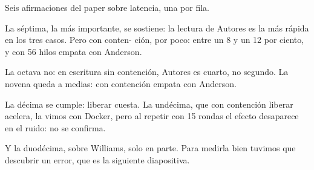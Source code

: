 Seis afirmaciones del paper sobre latencia, una por fila.

La séptima, la más importante, se sostiene: la lectura de Autores es la más rápida en los tres casos. Pero con conten- ción, por poco: entre un 8 y un 12 por ciento, y con 56 hilos empata con Anderson.

La octava no: en escritura sin contención, Autores es cuarto, no segundo. La novena queda a medias: con contención empata con Anderson.

La décima se cumple: liberar cuesta. La undécima, que con contención liberar acelera, la vimos con Docker, pero al repetir con 15 rondas el efecto desaparece en el ruido: no se confirma.

Y la duodécima, sobre Williams, solo en parte. Para medirla bien tuvimos que descubrir un error, que es la siguiente diapositiva.
